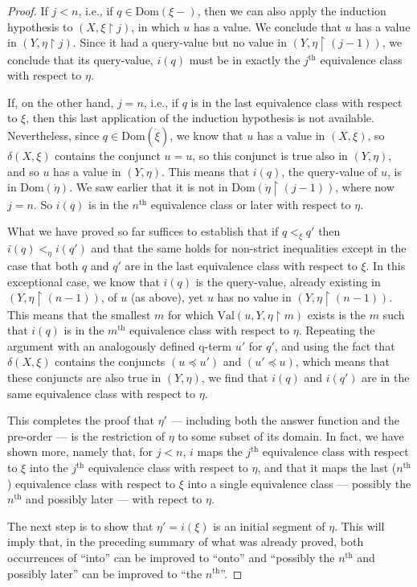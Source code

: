 \documentclass{LMCS}
\theoremstyle{definition}
\newcommand{\ans}{\dot}
\newcommand{\dom}[1]{\ensuremath{{\text{Dom}}(#1)}}
\newcommand{\restr}{\mathop{\upharpoonright}}
\newcommand{\val}[3]{\ensuremath{\text{Val}(#1,#2,#3)}}
\renewcommand{\th}{\ensuremath{{}^{\text{th}}}}
\begin{document}
\begin{proof}
If $j<n$, i.e., if $q\in\dom{\xi-}$, then we can also apply the
induction hypothesis to $(X,\xi\restr j)$, in which $u$ has a value.
We conclude that $u$ has a value in $(Y,\eta\restr j)$.  Since it had
a query-value but no value in $(Y,\eta\restr(j-1))$, we conclude that
its query-value, $i(q)$ must be in exactly the $j\th$ equivalence
class with respect to $\eta$.

If, on the other hand, $j=n$, i.e., if $q$ is in the last equivalence
class with respect to $\xi$, then this last application of the
induction hypothesis is not available.  Nevertheless, since
$q\in\dom{\ans\xi}$, we know that $u$ has a value in $(X,\xi)$, so
$\delta(X,\xi)$ contains the conjunct $u=u$, so this conjunct is true
also in $(Y,\eta)$, and so $u$ has a value in $(Y,\eta)$.  This means
that $i(q)$, the query-value of $u$, is in $\dom{\ans\eta}$.  We saw
earlier that it is not in $\dom{\ans\eta\restr(j-1)}$, where now
$j=n$.  So $i(q)$ is in the $n\th$ equivalence class or later with
respect to $\eta$.

What we have proved so far suffices to establish that if $q<_\xi q'$
then $i(q)<_\eta i(q')$ and that the same holds for non-strict
inequalities except in the case that both $q$ and $q'$ are in the last
equivalence class with respect to $\xi$.  In this exceptional case, we
know that $i(q)$ is the query-value, already existing in
$(Y,\eta\restr(n-1))$, of $u$ (as above), yet $u$ has no value in
$(Y,\eta\restr(n-1))$. This means that the smallest $m$ for which \val
uY{\eta\restr m} exists is the $m$ such that $i(q)$ is in the $m\th$
equivalence class with respect to $\eta$.  Repeating the argument with
an analogously defined q-term $u'$ for $q'$, and using the fact that
$\delta(X,\xi)$ contains the conjuncts $(u\preceq u')$ and $(u'\preceq
u)$, which means that these conjuncts are also true in $(Y,\eta)$, we
find that $i(q)$ and $i(q')$ are in the same equivalence class with
respect to $\eta$.

This completes the proof that $\eta'$ --- including both the answer
function and the pre-order --- is the restriction of $\eta$ to some
subset of its domain.  In fact, we have shown more, namely that, for
$j<n$, $i$ maps the $j\th$ equivalence class with respect to $\xi$
into the $j\th$ equivalence class with respect to $\eta$, and that it
maps the last ($n\th$) equivalence class with respect to $\xi$ into a
single equivalence class --- possibly the $n\th$ and possibly later
--- with repect to $\eta$.

The next step is to show that $\eta'=i(\xi)$ is an initial segment of
$\eta$.  This will imply that, in the preceding summary of what was
already proved, both occurrences of ``into'' can be improved to
``onto'' and ``possibly the $n\th$ and possibly later'' can be
improved to ``the $n\th$''.


\end{proof}
\end{document}
